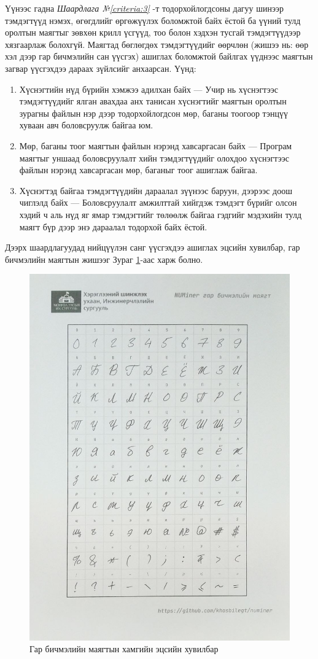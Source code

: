Үүнээс гадна \textit{Шаардлага №\ref{criteria:3}} -т тодорхойлогдсоны дагуу шинээр тэмдэгтүүд нэмэх, өгөгдлийг өргөжүүлэх боломжтой байх ёстой ба үүний тулд оролтын маягтыг зөвхөн крилл үсгүүд, тоо болон хэдхэн тусгай тэмдэгтүүдээр хязгаарлаж болохгүй. Маягтад бөглөгдөх тэмдэгтүүдийг өөрчлөн (жишээ нь: өөр хэл дээр гар бичмэлийн сан үүсгэх) ашиглах боломжтой байлгах үүднээс маягтын загвар үүсгэхдээ дараах зүйлсийг анхаарсан. Үүнд:

\begin{enumerate}
	\item Хүснэгтийн нүд бүрийн хэмжээ адилхан байх --- Учир нь хүснэгтээс тэмдэгтүүдийг ялган авахдаа анх танисан хүснэгтийг маягтын оролтын зурагны файлын нэр дээр тодорхойлогдсон мөр, баганы тоогоор тэнцүү хуваан авч боловсруулж байгаа юм.
	\item Мөр, баганы тоог маягтын файлын нэрэнд хавсаргасан байх --- Програм маягтыг уншаад боловсруулалт хийн тэмдэгтүүдийг олохдоо хүснэгтээс файлын нэрэнд хавсаргасан мөр, баганыг тоог ашиглаж байгаа.
	\item Хүснэгтэд байгаа тэмдэгтүүдийн дараалал зүүнээс баруун, дээрээс доош чиглэлд байх --- Боловсруулалт амжилттай хийгдэж тэмдэгт бүрийг олсон хэдий ч аль нүд яг ямар тэмдэгтийг төлөөлж байгаа гэдгийг мэдэхийн тулд маягт бүр дээр энэ дараалал тодорхой байх ёстой.
\end{enumerate}

Дээрх шаардлагуудад нийцүүлэн санг үүсгэхдээ ашиглах эцсийн хувилбар, гар бичмэлийн маягтын жишээг Зураг \ref{fig:sheet_final}-аас харж болно.

\begin{figure}[ht]
	\centering
	\includegraphics[width=0.6\linewidth]{images/sheet_final}
	\caption{Гар бичмэлийн маягтын хамгийн эцсийн хувилбар}
	\label{fig:sheet_final}
\end{figure}

